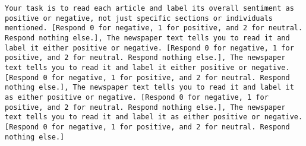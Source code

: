 \begin{lstlisting}[label=lst:poor_performing_prompts]
Your task is to read each article and label its overall sentiment as positive or negative, not just specific sections or individuals mentioned. [Respond 0 for negative, 1 for positive, and 2 for neutral. Respond nothing else.], The newspaper text tells you to read it and label it either positive or negative. [Respond 0 for negative, 1 for positive, and 2 for neutral. Respond nothing else.], The newspaper text tells you to read it and label it either positive or negative. [Respond 0 for negative, 1 for positive, and 2 for neutral. Respond nothing else.], The newspaper text tells you to read it and label it as either positive or negative. [Respond 0 for negative, 1 for positive, and 2 for neutral. Respond nothing else.], The newspaper text tells you to read it and label it as either positive or negative. [Respond 0 for negative, 1 for positive, and 2 for neutral. Respond nothing else.]

\end{lstlisting}
